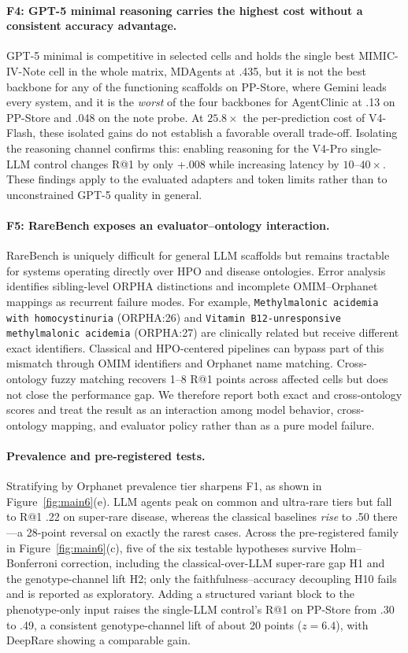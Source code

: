 \paragraph{F4: GPT-5 minimal reasoning carries the highest cost without a consistent accuracy advantage.}
GPT-5 minimal is competitive in selected cells and holds the single best MIMIC-IV-Note cell in the whole matrix, MDAgents at .435, but it is not the best backbone for any of the functioning scaffolds on PP-Store, where Gemini leads every system, and it is the \emph{worst} of the four backbones for AgentClinic at .13 on PP-Store and .048 on the note probe. At $25.8\times$ the per-prediction cost of V4-Flash, these isolated gains do not establish a favorable overall trade-off. Isolating the reasoning channel confirms this: enabling reasoning for the V4-Pro single-LLM control changes R@1 by only +.008 while increasing latency by $10$--$40\times$. These findings apply to the evaluated adapters and token limits rather than to unconstrained GPT-5 quality in general.

\paragraph{F5: RareBench exposes an evaluator--ontology interaction.}
RareBench is uniquely difficult for general LLM scaffolds but remains tractable for systems operating directly over HPO and disease ontologies. Error analysis identifies sibling-level ORPHA distinctions and incomplete OMIM--Orphanet mappings as recurrent failure modes. For example, \texttt{Methylmalonic acidemia with homocystinuria} (ORPHA:26) and \texttt{Vitamin B12-unresponsive methylmalonic acidemia} (ORPHA:27) are clinically related but receive different exact identifiers. Classical and HPO-centered pipelines can bypass part of this mismatch through OMIM identifiers and Orphanet name matching. Cross-ontology fuzzy matching recovers 1--8 R@1 points across affected cells but does not close the performance gap. We therefore report both exact and cross-ontology scores and treat the result as an interaction among model behavior, cross-ontology mapping, and evaluator policy rather than as a pure model failure.

\paragraph{Prevalence and pre-registered tests.}
Stratifying by Orphanet prevalence tier sharpens F1, as shown in Figure~\ref{fig:main6}(e). LLM agents peak on common and ultra-rare tiers but fall to R@1 .22 on super-rare disease, whereas the classical baselines \emph{rise} to .50 there---a 28-point reversal on exactly the rarest cases. Across the pre-registered family in Figure~\ref{fig:main6}(c), five of the six testable hypotheses survive Holm--Bonferroni correction, including the classical-over-LLM super-rare gap H1 and the genotype-channel lift H2; only the faithfulness--accuracy decoupling H10 fails and is reported as exploratory. Adding a structured variant block to the phenotype-only input raises the single-LLM control's R@1 on PP-Store from .30 to .49, a consistent genotype-channel lift of about 20 points ($z=6.4$), with DeepRare showing a comparable gain.

